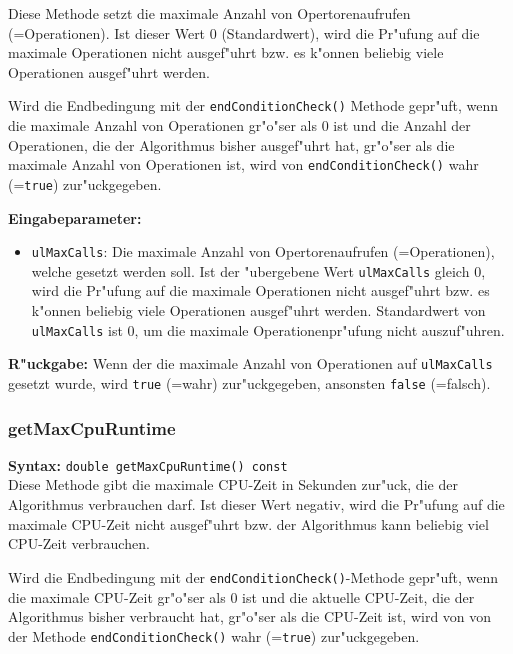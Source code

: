Diese Methode setzt die maximale Anzahl von Opertorenaufrufen (=Operationen). Ist dieser Wert $0$ (Standardwert), wird die Pr"ufung auf die maximale Operationen nicht ausgef"uhrt bzw. es k"onnen beliebig viele Operationen ausgef"uhrt werden.

Wird die Endbedingung mit der \verb|endConditionCheck()| Methode gepr"uft, wenn die maximale Anzahl von Operationen gr"o"ser als $0$ ist und die Anzahl der Operationen, die der Algorithmus bisher ausgef"uhrt hat, gr"o"ser als die maximale Anzahl von Operationen ist, wird von \verb|endConditionCheck()| wahr (=\verb|true|) zur"uckgegeben.

\bigskip\noindent
\textbf{Eingabeparameter:}
\begin{itemize}
 \item \verb|ulMaxCalls|: Die maximale Anzahl von Opertorenaufrufen (=Operationen), welche gesetzt werden soll. Ist der "ubergebene Wert \verb|ulMaxCalls| gleich $0$, wird die Pr"ufung auf die maximale Operationen nicht ausgef"uhrt bzw. es k"onnen beliebig viele Operationen ausgef"uhrt werden. Standardwert von \verb|ulMaxCalls| ist $0$, um die maximale Operationenpr"ufung nicht auszuf"uhren.
\end{itemize}

\bigskip\noindent
\textbf{R"uckgabe:} Wenn der die maximale Anzahl von Operationen auf \verb|ulMaxCalls| gesetzt wurde, wird \verb|true| (=wahr) zur"uckgegeben, ansonsten \verb|false| (=falsch).


\subsubsection{getMaxCpuRuntime}

\textbf{Syntax:} \verb|double getMaxCpuRuntime() const| \\

Diese Methode gibt die maximale CPU-Zeit in Sekunden zur"uck, die der Algorithmus verbrauchen darf. Ist dieser Wert negativ, wird die Pr"ufung auf die maximale CPU-Zeit nicht ausgef"uhrt bzw. der Algorithmus kann beliebig viel CPU-Zeit verbrauchen.

Wird die Endbedingung mit der \verb|endConditionCheck()|-Methode gepr"uft, wenn die maximale CPU-Zeit gr"o"ser als $0$ ist und die aktuelle CPU-Zeit, die der Algorithmus bisher verbraucht hat, gr"o"ser als die CPU-Zeit ist, wird von von der Methode \verb|endConditionCheck()| wahr (=\verb|true|) zur"uckgegeben.

